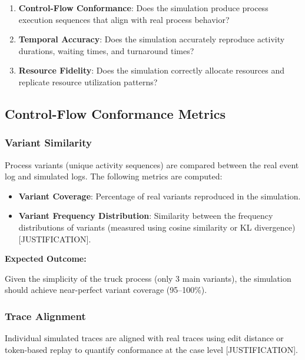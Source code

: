     \begin{enumerate}
        \item \textbf{Control-Flow Conformance}: Does the simulation produce process execution sequences that align with real process behavior?
        \item \textbf{Temporal Accuracy}: Does the simulation accurately reproduce activity durations, waiting times, and turnaround times?
        \item \textbf{Resource Fidelity}: Does the simulation correctly allocate resources and replicate resource utilization patterns?
    \end{enumerate}

    \subsection{Control-Flow Conformance Metrics}

        \subsubsection{Variant Similarity}
        
        Process variants (unique activity sequences) are compared between the real event log and simulated logs. The following metrics are computed:
        
        \begin{itemize}
            \item \textbf{Variant Coverage}: Percentage of real variants reproduced in the simulation.
            \item \textbf{Variant Frequency Distribution}: Similarity between the frequency distributions of variants (measured using cosine similarity or KL divergence) [JUSTIFICATION].
        \end{itemize}
        
        \textbf{Expected Outcome:}
        
        Given the simplicity of the truck process (only 3 main variants), the simulation should achieve near-perfect variant coverage (95--100\%).

        \subsubsection{Trace Alignment}
        
        Individual simulated traces are aligned with real traces using edit distance or token-based replay to quantify conformance at the case level [JUSTIFICATION].

